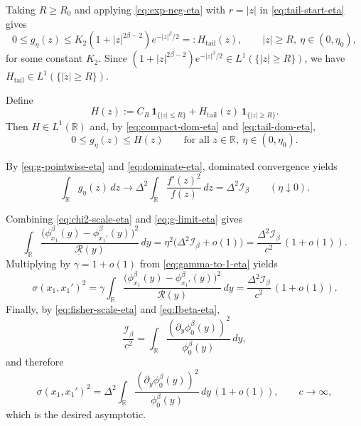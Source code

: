 \documentclass{article}
\theoremstyle{plain}
\theoremstyle{definition}
\begin{document}
Taking $R\ge R_0$ and applying \eqref{eq:exp-neg-eta} with $r=|z|$ in \eqref{eq:tail-start-eta} gives
\begin{equation}\label{eq:tail-dom-eta}
0\le g_\eta(z)\le K_2(1+|z|^{2\beta-2})e^{-|z|^\beta/2}
=:H_{\mathrm{tail}}(z),
\qquad |z|\ge R,\ \eta\in(0,\eta_0),
\end{equation}
for some constant $K_2$.
Since $(1+|z|^{2\beta-2})e^{-|z|^\beta/2}\in L^1(\{|z|\ge R\})$, we have $H_{\mathrm{tail}}\in L^1(\{|z|\ge R\})$.


Define
\[
H(z):=C_R\,\mathbf 1_{\{|z|\le R\}}+H_{\mathrm{tail}}(z)\,\mathbf 1_{\{|z|\ge R\}}.
\]
Then $H\in L^1(\mathbb R)$ and, by \eqref{eq:compact-dom-eta} and \eqref{eq:tail-dom-eta},
\begin{equation}\label{eq:dominate-eta}
0\le g_\eta(z)\le H(z)
\qquad\text{for all }z\in\mathbb R,\ \eta\in(0,\eta_0).
\end{equation}


By \eqref{eq:g-pointwise-eta} and \eqref{eq:dominate-eta}, dominated convergence yields
\begin{equation}\label{eq:g-limit-eta}
\int_{\mathbb R} g_\eta(z)\,dz
\longrightarrow
\Delta^2\int_{\mathbb R}\frac{f'(z)^2}{f(z)}\,dz
=\Delta^2\mathcal I_\beta
\qquad(\eta\downarrow 0).
\end{equation}


Combining \eqref{eq:chi2-scale-eta} and \eqref{eq:g-limit-eta} gives
\[
\int_{\mathbb R}\frac{\bigl(\phi_{x_1}^\beta(y)-\phi_{x_1'}^\beta(y)\bigr)^2}{\underline{\mathcal R}(y)}\,dy
=\eta^2\bigl(\Delta^2\mathcal I_\beta+o(1)\bigr)
=\frac{\Delta^2\mathcal I_\beta}{c^2}\,(1+o(1)).
\]
Multiplying by $\gamma=1+o(1)$ from \eqref{eq:gamma-to-1-eta} yields
\[
\sigma(x_1,x_1')^2
=\gamma\int_{\mathbb R}\frac{\bigl(\phi_{x_1}^\beta(y)-\phi_{x_1'}^\beta(y)\bigr)^2}{\underline{\mathcal R}(y)}\,dy
=\frac{\Delta^2\mathcal I_\beta}{c^2}\,(1+o(1)).
\]
Finally, by \eqref{eq:fisher-scale-eta} and \eqref{eq:Ibeta-eta},
\[
\frac{\mathcal I_\beta}{c^2}
=\int_{\mathbb R}\frac{(\partial_y\phi_0^\beta(y))^2}{\phi_0^\beta(y)}\,dy,
\]
and therefore
\[
\sigma(x_1,x_1')^2
=
\Delta^2\int_{\mathbb R}\frac{(\partial_y\phi_0^\beta(y))^2}{\phi_0^\beta(y)}\,dy\,
(1+o(1)),
\qquad c\to\infty,
\]
which is the desired asymptotic.
\end{document}
